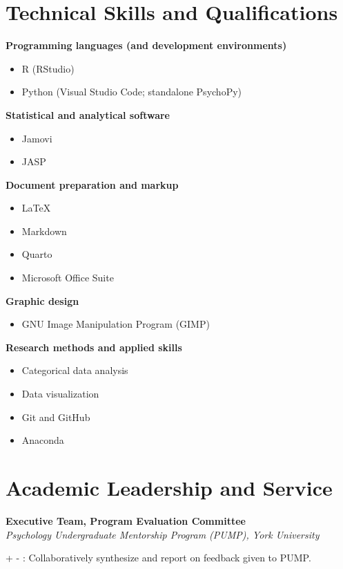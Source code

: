 \documentclass[12pt]{article}
\makeatletter
\newlength{\entryskip}
\newcommand{\entrygap}{\par\vspace{\entryskip}}
\newlength{\detaillabelwidth}
\newcommand{\smallitem}[2][]{%
  \par{\small\color{dimgray}%
  \ifx\relax#1\relax\else
    \settowidth{\detaillabelwidth}{\textit{#1}: }%
    \parshape 2 \@totalleftmargin \linewidth
      \dimexpr\@totalleftmargin+\detaillabelwidth\relax
      \dimexpr\linewidth-\detaillabelwidth\relax
    \textit{#1}: %
  \fi
  #2\par}%
  \@ifnextchar\\{\smallitem@gobblecr}{}}
\def\smallitem@gobblecr\\{\@ifnextchar[{\smallitem@gobbleopt}{}}
\def\smallitem@gobbleopt[#1]{}
\newcommand{\subhead}[2][]{\textbf{#2}\ifx\relax#1\relax\else\years{#1}\fi\par\vspace{\entryskip}}
\makeatother
\begin{document}
\section{Technical Skills and Qualifications}
\subhead{Programming languages (and development environments)}
\begin{itemize}
    \item R (RStudio)
    \item Python (Visual Studio Code; standalone PsychoPy)
\end{itemize}

\entrygap
\subhead{Statistical and analytical software}
\begin{itemize}
    \item Jamovi
    \item JASP
\end{itemize}

\entrygap
\subhead{Document preparation and markup}
\begin{itemize}
    \item \LaTeX
    \item Markdown
    \item Quarto
    \item Microsoft Office Suite
\end{itemize}

\entrygap
\subhead{Graphic design}
\begin{itemize}
    \item GNU Image Manipulation Program (GIMP)
\end{itemize}
\entrygap
\subhead{Research methods and applied skills} 
\begin{itemize}
    \item Categorical data analysis
    \item Data visualization 
    \item Git and GitHub 
    \item Anaconda 
\end{itemize}

\section{Academic Leadership and Service}

\textbf{Executive Team, Program Evaluation Committee} \\
\textit{Psychology Undergraduate Mentorship Program (PUMP), York University}\\
\smallitem{Collaboratively synthesize and report on feedback given to PUMP.}
\entrygap
\end{document}
